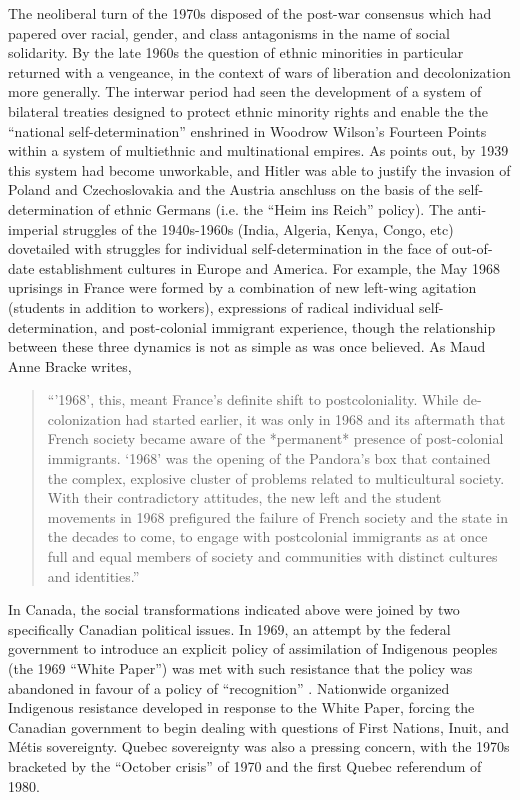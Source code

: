 \documentclass[12pt,oneside]{memoir}
\begin{document}
The neoliberal turn of the 1970s disposed of the post-war consensus which had papered over racial, gender, and class antagonisms in the name of social solidarity. By the late 1960s the question of ethnic minorities in particular returned with a vengeance, in the context of wars of liberation and decolonization more generally. The interwar period had seen the development of a system of bilateral treaties designed to protect ethnic minority rights and enable the the ``national self-determination'' enshrined in Woodrow Wilson's Fourteen Points within a system of multiethnic and multinational empires. As \cite[2]{kymlicka-1995} points out, by 1939 this system had become unworkable, and Hitler was able to justify the invasion of Poland and Czechoslovakia and the Austria anschluss on the basis of the self-determination of ethnic Germans (i.e. the ``Heim ins Reich'' policy). The anti-imperial struggles of the 1940s-1960s (India, Algeria, Kenya, Congo, etc) dovetailed with struggles for individual self-determination in the face of out-of-date establishment cultures in Europe and America. For example, the May 1968 uprisings in France were formed by a combination of new left-wing agitation (students in addition to workers), expressions of radical individual self-determination, and post-colonial immigrant experience, though the relationship between these three dynamics is not as simple as was once believed. As Maud Anne Bracke writes,
\begin{quote}
	``'1968', this, meant France's definite shift to postcoloniality. While de-colonization had started earlier, it was only in 1968 and its aftermath that French society became aware of the *permanent* presence of post-colonial immigrants. `1968' was the opening of the Pandora's box that contained the complex, explosive cluster of problems related to multicultural society. With their contradictory attitudes, the new left and the student movements in 1968 prefigured the failure of French society and the state in the decades to come, to engage with postcolonial immigrants as at once full and equal members of society and communities with distinct cultures and identities.'' \citep[128]{bracke-2009}
\end{quote}

In Canada, the social transformations indicated above were joined by two specifically Canadian political issues. In 1969, an attempt by the federal government to introduce an explicit policy of assimilation of Indigenous peoples (the 1969 ``White Paper'') was met with such resistance that the policy was abandoned in favour of a policy of ``recognition'' \citep{coulthard2014}. Nationwide organized Indigenous resistance developed in response to the White Paper, forcing the Canadian government to begin dealing with questions of First Nations, Inuit, and Métis sovereignty. Quebec sovereignty was also a pressing concern, with the 1970s bracketed by the ``October crisis'' of 1970 and the first Quebec referendum of 1980.
\end{document}
